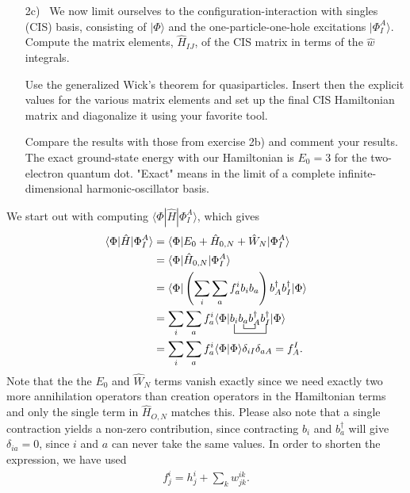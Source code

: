 \documentclass[a4paper]{article}
\newcommand{\nn}{\nonumber}
\begin{document}
\begin{exframe}
\begin{itemize}
  \item[2c)] We now limit ourselves to the configuration-interaction with singles (CIS) basis, consisting of $|\Phi\rangle$ and the one-particle-one-hole excitations $|\Phi^A_I\rangle$. Compute the matrix elements, $\hat{H}_{IJ}$, of the CIS matrix in terms of the $\hat{w}$ integrals.

  Use the generalized Wick's theorem for quasiparticles. Insert then the explicit values for the various matrix elements and set up the final CIS Hamiltonian matrix and diagonalize it using your favorite tool. 

  Compare the results with those from exercise 2b) and comment your results. The exact ground-state energy with our Hamiltonian is $E_0=3$ for the two-electron quantum dot. "Exact" means in the limit of a complete infinite-dimensional harmonic-oscillator basis.
\end{itemize}
\end{exframe}
We start out with computing $\langle \Phi|\hat{H}|\Phi^A_I\rangle$, which gives
\begin{align}
\langle \Phi|\hat{H}|\Phi^A_I\rangle &= \langle \Phi|E_0 + \hat{H}_{0,N} + \hat{W}_N|\Phi^A_I\rangle \nn\\
 &= \langle \Phi|\hat{H}_{0,N}|\Phi^A_I\rangle \nn\\
 &= \langle \Phi|\left(\sum_i\sum_a f^i_a b_ib_a\right) b_A^\dagger b_I^\dagger|\Phi\rangle \nn\\
 &= \sum_i \sum_a f^i_a\langle \Phi |\bcontraction[2ex]{}{b_i}{b_ab_A^\dagger}{b_I^\dagger}\bcontraction{b_i}{b_a}{}{b_A}b_ib_ab_A^\dagger b_I^\dagger | \Phi \rangle \nn\\
 &= \sum_i \sum_a f^i_a \langle \Phi | \Phi \rangle \delta_{iI}\delta_{aA} = f^I_A.
\end{align}
Note that the the $E_0$ and $\hat{W}_N$ terms vanish exactly since we need exactly two more annihilation operators than creation operators in the Hamiltonian terms and only the single term in $\hat{H}_{O,N}$ matches this. Please also note that a single contraction yields a non-zero contribution, since contracting $b_i$ and $b_a^\dagger$ will give $\delta_{ia}=0$, since $i$ and $a$ can never take the same values. In order to shorten the expression, we have used 
\begin{align}
f^i_j= h^i_j + \sum_k w^{ik}_{jk}.
\end{align}
\end{document}
